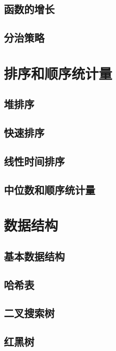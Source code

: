 \documentclass[oneside,10pt]{ctexbook}
\begin{document}
\chapter{函数的增长}

\chapter{分治策略}

\part{排序和顺序统计量}

\chapter{堆排序}

\chapter{快速排序}

\chapter{线性时间排序}

\chapter{中位数和顺序统计量}

\part{数据结构}

\chapter{基本数据结构}

\chapter{哈希表}

\chapter{二叉搜索树}

\chapter{红黑树}
\end{document}
